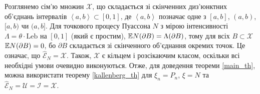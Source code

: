 Розглянемо сім'ю множин $\mathcal{X}$, що складається зі
скінченних диз'юнктних об'єд\-нань інтервалів $\left<a,b\right> \subset [0, 1]$,
де $\left<a,b\right>$ позначає одне з $[a, b]$, $(a, b)$, $[a, b)$ чи $(a, b]$.
Для точкового процесу Пуассона $N$
з мірою інтенсивності $\Lambda = \theta \cdot \mathrm{Leb}$ на $[0, 1]$ 
(який є простим),
$\mathbb{E} N(\partial B) = \Lambda (\partial B)$, тому 
для всіх $B \subset \mathcal{X}$ $\mathbb{E} N(\partial B) = 0$, бо
$\partial B$ складається зі скінченного об'єднання окремих точок.
Це означає, що $\hat{\mathcal{E}}_N = \mathcal{X}$.
Також, $\mathcal{X}$ є кільцем і розсікаючим класом, оскільки всі необхідні
умови очевидно виконуються.
Отже, для доведення теореми \ref{main_th}, можна використати теорему
\ref{kallenberg_th}
для $\xi_n = P_n$, $\xi = N$ та
$\hat{\mathcal{E}}_N = \mathcal{U} = \mathcal{I} = \mathcal{X}$.


